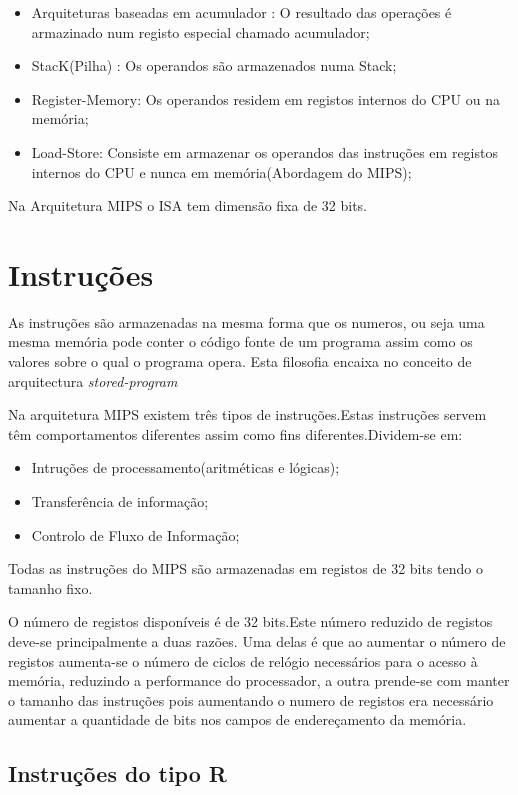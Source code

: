 \documentclass[10pt,a4paper]{book}
\begin{document}
	\begin{itemize}
		\item Arquiteturas baseadas em acumulador : O resultado das operações é armazinado num registo especial chamado acumulador;
		\item StacK(Pilha) : Os operandos são armazenados numa Stack;
		\item Register-Memory: Os operandos residem em registos internos do CPU ou na memória;
		\item Load-Store: Consiste em armazenar os operandos das instruções em registos internos do CPU e nunca em memória(Abordagem do MIPS);
	\end{itemize}

	Na Arquitetura MIPS o ISA tem dimensão fixa de 32 bits.

	\section{Instruções}
	As instruções são armazenadas na mesma forma que os numeros, ou seja uma mesma memória pode conter o código fonte de um programa  assim como os valores sobre o qual o programa opera. Esta filosofia encaixa no conceito de arquitectura \textit{stored-program}

	Na arquitetura MIPS existem três tipos de instruções.Estas instruções servem têm comportamentos diferentes assim como fins diferentes.Dividem-se em:
	\begin{itemize}
		\item Intruções de processamento(aritméticas e lógicas);
		\item Transferência de informação;
		\item Controlo de Fluxo de Informação;
	\end{itemize}

	Todas as instruções do MIPS são armazenadas em registos de 32 bits tendo o tamanho fixo.

	O número de registos disponíveis é de 32 bits.Este número reduzido de registos deve-se principalmente a duas razões. Uma delas é que ao aumentar o número de registos aumenta-se o número de	ciclos de relógio necessários para o acesso à memória, reduzindo a performance do processador, a outra prende-se com manter o tamanho das instruções pois aumentando o numero de registos era necessário
	aumentar a quantidade de bits nos campos de endereçamento da memória.




	\subsection{Instruções do tipo R}
\end{document}
